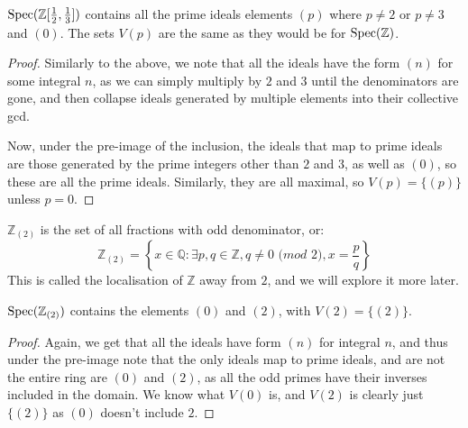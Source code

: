 \begin{example}
    $\operatorname{Spec} (\mathbb{Z}[\frac{1}{2},\frac{1}{3}])$ contains all the prime ideals elements $(p)$ where $p \neq 2$ or $p \neq 3$ and $(0)$. The sets $V(p)$ are the same as they would be for $\operatorname{Spec} (\mathbb{Z})$.
\end{example}
\begin{proof}
    Similarly to the above, we note that all the ideals have the form $(n)$ for some integral $n$, as we can simply multiply by $2$ and $3$ until the denominators are gone, and then collapse ideals generated by multiple elements into their collective gcd.

    Now, under the pre-image of the inclusion, the ideals that map to prime ideals are those generated by the prime integers other than $2$ and $3$, as well as $(0)$, so these are all the prime ideals. Similarly, they are all maximal, so $V(p) = \{(p)\}$ unless $p = 0$.
\end{proof}
\begin{definition}
    $\mathbb{Z}_{(2)}$ is the set of all fractions with odd denominator, or:
    \[ \mathbb{Z}_{(2)} = \left\{ x \in \mathbb{Q} : \exists p,q \in \mathbb{Z}, q \neq 0 \textit{ (mod 2)}, x = \frac{p}{q} \right\} \]
    This is called the localisation of $\mathbb{Z}$ away from $2$, and we will explore it more later.
\end{definition}

\begin{example}
    $\operatorname{Spec} (\mathbb{Z}_{(2)})$ contains the elements $(0)$ and $(2)$, with $V(2) = \{(2)\}$.
\end{example}
\begin{proof}
    Again, we get that all the ideals have form $(n)$ for integral $n$, and thus under the pre-image note that the only ideals map to prime ideals, and are not the entire ring are $(0)$ and $(2)$, as all the odd primes have their inverses included in the domain. We know what $V(0)$ is, and $V(2)$ is clearly just $\{(2)\}$ as $(0)$ doesn't include $2$.
\end{proof}

